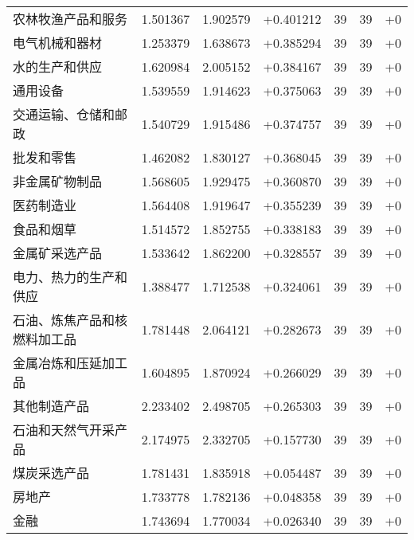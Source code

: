 \begin{table}[htbp]
\begin{tabular}{lrrrrrr}
农林牧渔产品和服务 & 1.501367 & 1.902579 & +0.401212 & 39 & 39 & +0 \\
电气机械和器材 & 1.253379 & 1.638673 & +0.385294 & 39 & 39 & +0 \\
水的生产和供应 & 1.620984 & 2.005152 & +0.384167 & 39 & 39 & +0 \\
通用设备 & 1.539559 & 1.914623 & +0.375063 & 39 & 39 & +0 \\
交通运输、仓储和邮政 & 1.540729 & 1.915486 & +0.374757 & 39 & 39 & +0 \\
批发和零售 & 1.462082 & 1.830127 & +0.368045 & 39 & 39 & +0 \\
非金属矿物制品 & 1.568605 & 1.929475 & +0.360870 & 39 & 39 & +0 \\
医药制造业 & 1.564408 & 1.919647 & +0.355239 & 39 & 39 & +0 \\
食品和烟草 & 1.514572 & 1.852755 & +0.338183 & 39 & 39 & +0 \\
金属矿采选产品 & 1.533642 & 1.862200 & +0.328557 & 39 & 39 & +0 \\
电力、热力的生产和供应 & 1.388477 & 1.712538 & +0.324061 & 39 & 39 & +0 \\
石油、炼焦产品和核燃料加工品 & 1.781448 & 2.064121 & +0.282673 & 39 & 39 & +0 \\
金属冶炼和压延加工品 & 1.604895 & 1.870924 & +0.266029 & 39 & 39 & +0 \\
其他制造产品 & 2.233402 & 2.498705 & +0.265303 & 39 & 39 & +0 \\
石油和天然气开采产品 & 2.174975 & 2.332705 & +0.157730 & 39 & 39 & +0 \\
煤炭采选产品 & 1.781431 & 1.835918 & +0.054487 & 39 & 39 & +0 \\
房地产 & 1.733778 & 1.782136 & +0.048358 & 39 & 39 & +0 \\
金融 & 1.743694 & 1.770034 & +0.026340 & 39 & 39 & +0 \\
\bottomrule
\end{tabular}
\end{table}
